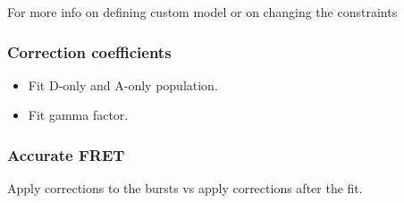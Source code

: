 For more info on defining custom model or on changing the constraints


\subsubsection{Correction coefficients}


\begin{itemize}
\item Fit D-only and A-only population.
\item Fit gamma factor.
\end{itemize}


\subsubsection{Accurate FRET}

Apply corrections to the bursts vs apply corrections after the fit.

